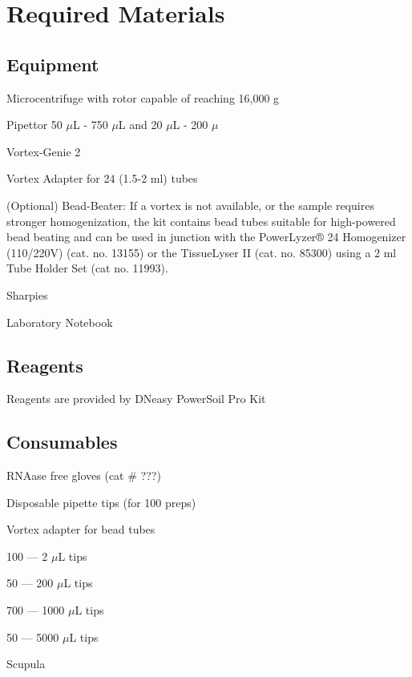 \documentclass[12pt]{SOP5_beta}\usepackage[]{graphicx}\usepackage[]{xcolor}
\begin{document}
\section{Required Materials}

\subsection*{Equipment}

\NP Microcentrifuge with rotor capable of reaching 16,000 g

\NP Pipettor 50 $\mu$L - 750 $\mu$L and 20 $\mu$L - 200 $\mu$

\NP Vortex-Genie 2

\NP Vortex Adapter for 24 (1.5-2 ml) tubes

\NP (Optional) Bead-Beater: If a vortex is not available, or the sample requires stronger homogenization, the kit contains bead tubes suitable for high-powered bead beating and can be used in junction with the PowerLyzer® 24 Homogenizer (110/220V) (cat. no. 13155) or the TissueLyser II (cat. no. 85300) using a 2 ml Tube Holder Set (cat no. 11993).

\NP Sharpies

\NP Laboratory Notebook

\subsection*{Reagents}

\NP Reagents are provided by DNeasy PowerSoil Pro Kit 

\subsection*{Consumables}

\NP RNAase free gloves (cat \# ???)

\NP Disposable pipette tips (for 100 preps) 

\NP Vortex adapter for bead tubes

\begin{itemize*}
  \item 100 --- 2 $\mu$L tips
  \item 50 --- 200 $\mu$L tips
  \item 700 --- 1000 $\mu$L tips
  \item 50 --- 5000 $\mu$L tips

\end{itemize*}

\NP Scupula
\end{document}
